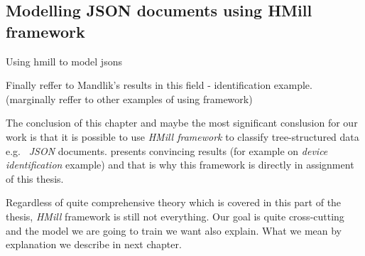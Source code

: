 \subsection{Modelling JSON documents using HMill framework}


Using hmill to model jsons

Finally reffer to Mandlik's results in this field - identification example. (marginally reffer to other examples of using framework)


The conclusion of this chapter and maybe the most significant conslusion for our work is that it is possible to use \emph{HMill framework} to classify tree-structured data e.g. \ \emph{JSON} documents. \citeauthor{Mandlik2020} presents convincing results (for example on \emph{device identification} example) and that is why this framework is directly in assignment of this thesis.

Regardless of quite comprehensive theory which is covered in this part of the thesis, \emph{HMill} framework is still not everything. Our goal is quite cross-cutting and the model we are going to train we want also explain. What we mean by explanation we describe in next chapter.






